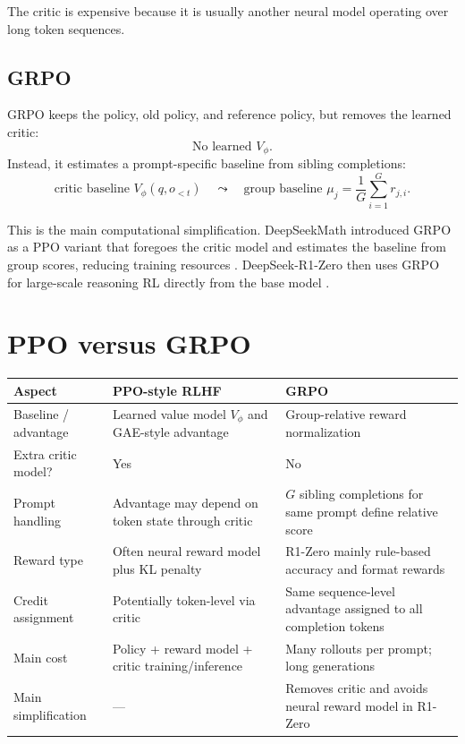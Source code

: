 \documentclass[11pt]{article}
\begin{document}
The critic is expensive because it is usually another neural model operating over long token sequences.

\subsection{GRPO}

GRPO keeps the policy, old policy, and reference policy, but removes the learned critic:
\[
\boxed{\text{No learned } V_\phi.}
\]
Instead, it estimates a prompt-specific baseline from sibling completions:
\begin{equation}
\text{critic baseline } V_\phi(q,o_{<t})
\quad \leadsto \quad
\text{group baseline } \mu_j=\frac{1}{G}\sum_{i=1}^{G}r_{j,i}.
\end{equation}

This is the main computational simplification. DeepSeekMath introduced GRPO as a PPO variant that foregoes the critic model and estimates the baseline from group scores, reducing training resources \cite{shao2024deepseekmath}. DeepSeek-R1-Zero then uses GRPO for large-scale reasoning RL directly from the base model \cite{guo2025r1}.

\section{PPO versus GRPO}

\begin{center}
\begin{tabular}{@{}p{}p{}p{}@{}}
\toprule
Aspect & PPO-style RLHF & GRPO \\
\midrule
Baseline / advantage & Learned value model $V_\phi$ and GAE-style advantage & Group-relative reward normalization \\
Extra critic model? & Yes & No \\
Prompt handling & Advantage may depend on token state through critic & $G$ sibling completions for same prompt define relative score \\
Reward type & Often neural reward model plus KL penalty & R1-Zero mainly rule-based accuracy and format rewards \\
Credit assignment & Potentially token-level via critic & Same sequence-level advantage assigned to all completion tokens \\
Main cost & Policy + reward model + critic training/inference & Many rollouts per prompt; long generations \\
Main simplification & --- & Removes critic and avoids neural reward model in R1-Zero \\
\bottomrule
\end{tabular}
\end{center}
\end{document}
